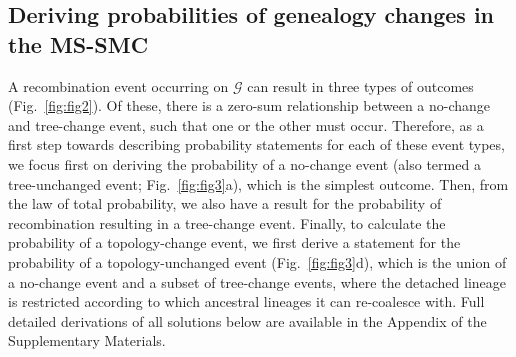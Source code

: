 \documentclass[11pt]{article}
\begin{document}


\subsection{Deriving probabilities of genealogy changes in the MS-SMC}
A recombination event occurring on $\mathcal{G}$ can result 
in three types of outcomes (Fig.~\ref{fig:fig2}).
Of these, there is a zero-sum relationship between a no-change and 
tree-change event, such that one or the other must occur.
Therefore, as a first step towards describing probability statements 
for each of these event types, we focus first on deriving the 
probability of a no-change event 
(also termed a tree-unchanged event; Fig.~\ref{fig:fig3}a), 
which is the simplest outcome. Then, from the law of total probability, 
we also have a result for the probability of recombination resulting in 
a tree-change event. 
Finally, to calculate the probability of a topology-change event, 
we first derive a statement for the probability of a topology-unchanged event
(Fig.~\ref{fig:fig3}d), which is the union of a no-change event and
a subset of tree-change events,
where the detached lineage is restricted according to which ancestral lineages 
it can re-coalesce with. 
Full detailed derivations of all solutions below are available in the 
Appendix of the Supplementary Materials.
\end{document}
